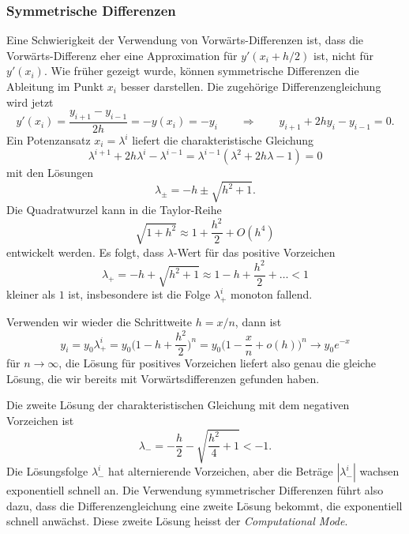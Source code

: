 \subsubsection{Symmetrische Differenzen}
Eine Schwierigkeit der Verwendung von Vorwärts-Differenzen ist, dass
die Vorwärts-Differenz eher eine Approximation für $y'(x_i+h/2)$ ist,
nicht für $y'(x_i)$.
Wie früher gezeigt wurde, können symmetrische Differenzen die Ableitung
im Punkt $x_i$ besser darstellen.
Die zugehörige Differenzengleichung wird jetzt
\[
y'(x_i)
=
\frac{y_{i+1}-y_{i-1}}{2h}
=
-y(x_i)
=
-y_i
\qquad\Rightarrow\qquad
y_{i+1}+2hy_i-y_{i-1}=0.
\]
Ein Potenzansatz $x_i=\lambda^i$ liefert die charakteristische Gleichung
\[
\lambda^{i+1} +2h\lambda^i -\lambda^{i-1}
=
\lambda^{i-1}(\lambda^2 + 2h\lambda -1)
=
0
\]
mit den Lösungen
\[
\lambda_\pm = -h \pm \sqrt{h^2+1}.
\]
Die Quadratwurzel kann in die Taylor-Reihe
%
%
\[
\sqrt{1+h^2}
\approx
1 + \frac{h^2}2 + O(h^4)
\]
entwickelt werden.
Es folgt, dass $\lambda$-Wert für das positive Vorzeichen
\[
\lambda_+
=
-h+\sqrt{h^2+1}
\approx
1-h+\frac{h^2}{2}+\dots
<
1
\]
kleiner als $1$ ist, insbesondere ist die Folge $\lambda_+^i$ monoton fallend.

Verwenden wir wieder die Schrittweite $h=x/n$, dann ist
\[
y_i
=
y_0 \lambda_+^i
=
y_0 \biggl(1-h+\frac{h^2}2\biggr)^n
=
y_0\biggl(1-\frac{x}n + o(h)\biggr)^n
\to
y_0e^{-x}
\]
für $n\to\infty$, die Lösung für positives Vorzeichen liefert also genau
die gleiche Lösung, die wir bereits mit Vorwärtsdifferenzen gefunden haben.

Die zweite Lösung der charakteristischen Gleichung mit dem negativen
Vorzeichen ist
\[
\lambda_-
=
-\frac{h}2 - \sqrt{\frac{h^2}{4}+1}
<
-1.
\]
Die Lösungsfolge $\lambda_-^i$ hat alternierende Vorzeichen, aber die 
Beträge $|\lambda_-^i|$ wachsen exponentiell schnell an.
Die Verwendung symmetrischer Differenzen führt also dazu, dass die
Differenzengleichung eine zweite Lösung bekommt, die exponentiell
schnell anwächst.
Diese zweite Lösung heisst der {\em Computational Mode}.

